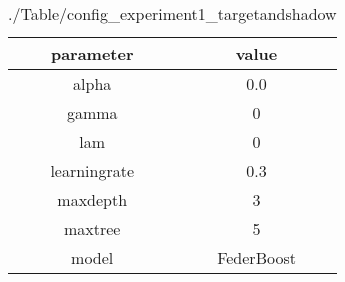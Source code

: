 \begin{table}[h]
\centering
\begin{tabular}{|c|c|}
\hline
parameter & value\\
\hline
alpha & 0.0 \\\hline
gamma & 0 \\\hline
lam & 0 \\\hline
learningrate & 0.3 \\\hline
maxdepth & 3 \\\hline
maxtree & 5 \\\hline
model & FederBoost \\\hline

\end{tabular}\caption{./Table/config_experiment1_targetandshadow}
\label{tab:./Table/config_experiment1_targetandshadow}
\end{table}
